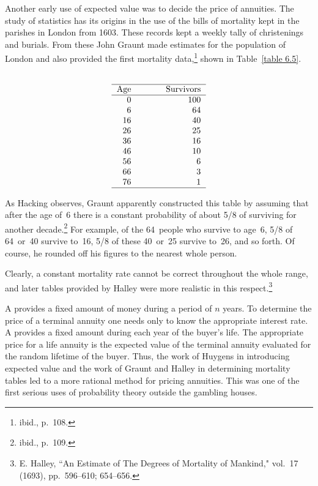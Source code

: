 Another early use of expected value was to decide the price of annuities.  The study
of statistics has its origins in the use of the bills of mortality kept in the
parishes in London from 1603.  These records kept a weekly tally of christenings and
burials.  From these John Graunt made estimates for the population of London and
also provided the first mortality 
data,\footnote{ibid., p.~108.} shown in Table~\ref{table 6.5}.
\begin{table}
\centering
$$ 
\begin{tabular}{rr}
    & \\ \hline
 Age &\hspace{.35in} Survivors  \\ \hline
 0    &  100  \\
 6    &   64  \\ 16    &   40  \\ 26    &   25  \\ 36    &   16  \\ 46    &   10  \\
56    &    6  \\ 66    &    3  \\ 76    &    1  \\ \hline
\end{tabular}$$
\caption{Graunt's mortality data.}
\label{table 6.5}
\end{table}

As Hacking observes, Graunt apparently constructed this table by assuming that after
the age of~6 there is a constant probability of about 5/8 of surviving for another
decade.\footnote{ibid., p.~109.}  For example, of the 64~people who survive to age~6,
5/8 of 64~or~40 survive to~16, 5/8 of these 40~or~25 survive to~26, and so forth.  Of
course, he rounded off his figures to the nearest whole person.

Clearly, a constant mortality rate cannot be correct throughout the whole range, and
later tables provided by Halley were more realistic in this respect.\footnote{E.
Halley, ``An Estimate of The Degrees of Mortality of Mankind,"  vol.~17 (1693), pp.~596--610; 654--656.}

A  provides a fixed amount of money during a period of
$n$ years.  To determine the price of a terminal annuity one needs only to know the
appropriate interest rate.  A \emx {life annuity}\index{annuity!life} provides a fixed amount during
each year of the buyer's life.  The appropriate price for a life annuity is the
expected value of the terminal annuity evaluated for the random lifetime of the
buyer.  Thus, the work of Huygens in introducing expected value and the work of
Graunt and Halley in determining mortality tables led to a more rational method for
pricing annuities.  This was one of the first serious uses of probability theory
outside the gambling houses.


